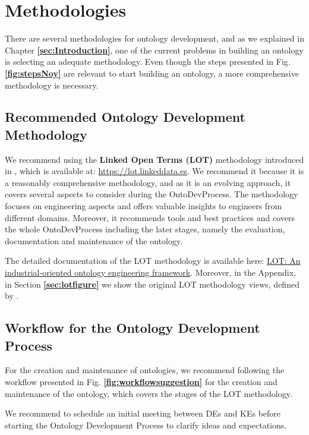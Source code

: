 \documentclass{guideline/sty/rapport}
\begin{document}
\section{Methodologies}
\label{sec:methodologies}
There are several methodologies for ontology development, and as we explained in Chapter \textbf{\ref{sec:Introduction}}, one of the current problems in building an ontology is selecting an adequate methodology. Even though the steps presented in Fig. \textbf{\ref{fig:stepsNoy}} are relevant to start building an ontology, a more comprehensive methodology is necessary.  \singlespacing

\subsection{Recommended Ontology Development Methodology}

We recommend using the \textbf{Linked Open Terms (LOT)} methodology introduced in \cite{Poveda22}, which is available at:
\url{https://lot.linkeddata.es}. We recommend it because it is a reasonably comprehensive methodology, and as it is an evolving approach, it covers several aspects to consider during the \ac{OntoDevProcess}. The methodology focuses on engineering aspects and offers valuable insights to engineers from different domains. Moreover, it recommends tools and best practices and covers the whole \ac{OntoDevProcess} including the later stages, namely the evaluation, documentation and maintenance of the ontology. \singlespacing

The detailed documentation of the LOT methodology is available here:  \href{https://www.sciencedirect.com/science/article/pii/S0952197622000525?via\%3Dihub}{LOT: An industrial-oriented ontology engineering framework}. Moreover, in the Appendix, in Section \textbf{\ref{sec:lotfigure}} we show the original LOT methodology views, defined by \cite{Poveda22}.

\subsection{Workflow for the Ontology Development Process}
For the creation and maintenance of ontologies, we recommend following the workflow presented in Fig. \textbf{\ref{fig:workflowsuggestion}} for the creation and maintenance of the ontology, which covers the stages of the LOT methodology. \singlespacing

\begin{beware}[Remark]
We recommend to schedule an initial meeting between \ac{DEs} and \ac{KEs} before starting the Ontology Development Process to clarify ideas and expectations.
\end{beware}
\end{document}
